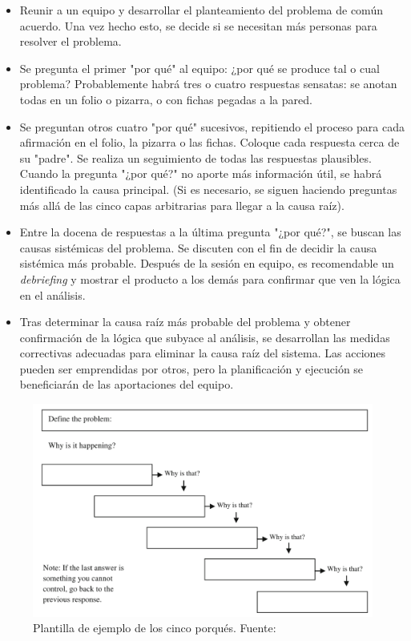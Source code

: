 \begin{itemize}
    \item Reunir a un equipo y desarrollar el planteamiento del problema de común acuerdo. Una vez hecho esto, se decide si se necesitan más personas para resolver el problema.
    \item Se pregunta el primer "por qué" al equipo: ¿por qué se produce tal o cual problema? Probablemente habrá tres o cuatro respuestas sensatas: se anotan todas en un folio o pizarra, o con fichas pegadas a la pared.
    \item Se preguntan otros cuatro "por qué" sucesivos, repitiendo el proceso para cada afirmación en el folio, la pizarra o las fichas. Coloque cada respuesta cerca de su "padre". Se realiza un seguimiento de todas las respuestas plausibles. Cuando la pregunta "¿por qué?" no aporte más información útil, se habrá identificado la causa principal. (Si es necesario, se siguen haciendo preguntas más allá de las cinco capas arbitrarias para llegar a la causa raíz).
    \item Entre la docena de respuestas a la última pregunta "¿por qué?", se buscan las causas sistémicas del problema. Se discuten con el fin de decidir la causa sistémica más probable. Después de la sesión en equipo, es recomendable un \textit{debriefing} y mostrar el producto a los demás para confirmar que ven la lógica en el análisis.
    \item Tras determinar la causa raíz más probable del problema y obtener confirmación de la lógica que subyace al análisis, se desarrollan las medidas correctivas adecuadas para eliminar la causa raíz del sistema. Las acciones pueden ser emprendidas por otros, pero la planificación y ejecución se beneficiarán de las aportaciones del equipo.
\end{itemize}

\begin{figure}
    \centering
    \includegraphics[width=\textwidth]{img/five-whys.png}
    \caption{Plantilla de ejemplo de los cinco porqués. Fuente: }
    \label{fig:five-whys}
\end{figure}

